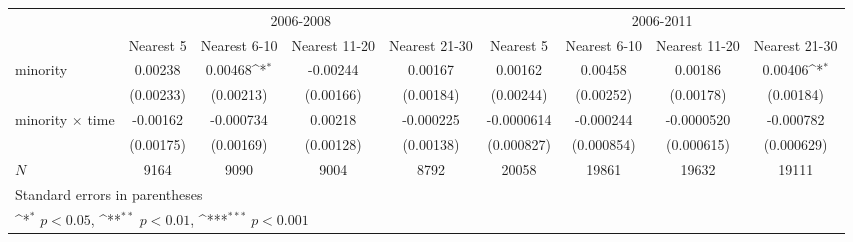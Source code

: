 {
\def\sym#1{\ifmmode^{#1}\else\(^{#1}\)\fi}
\begin{tabular}{l*{8}{c}}
\hline\hline
            &\multicolumn{4}{c}{2006-2008}                                                          &\multicolumn{4}{c}{2006-2011}                                                          \\\cmidrule(lr){2-5}\cmidrule(lr){6-9}
            &\multicolumn{1}{c}{Nearest 5}&\multicolumn{1}{c}{Nearest 6-10}&\multicolumn{1}{c}{Nearest 11-20}&\multicolumn{1}{c}{Nearest 21-30}&\multicolumn{1}{c}{Nearest 5}&\multicolumn{1}{c}{Nearest 6-10}&\multicolumn{1}{c}{Nearest 11-20}&\multicolumn{1}{c}{Nearest 21-30}\\
\hline
minority    &     0.00238         &     0.00468\sym{*}  &    -0.00244         &     0.00167         &     0.00162         &     0.00458         &     0.00186         &     0.00406\sym{*}  \\
            &   (0.00233)         &   (0.00213)         &   (0.00166)         &   (0.00184)         &   (0.00244)         &   (0.00252)         &   (0.00178)         &   (0.00184)         \\
[1em]
minority $\times$ time&    -0.00162         &   -0.000734         &     0.00218         &   -0.000225         &  -0.0000614         &   -0.000244         &  -0.0000520         &   -0.000782         \\
            &   (0.00175)         &   (0.00169)         &   (0.00128)         &   (0.00138)         &  (0.000827)         &  (0.000854)         &  (0.000615)         &  (0.000629)         \\
\hline
\(N\)       &        9164         &        9090         &        9004         &        8792         &       20058         &       19861         &       19632         &       19111         \\
\hline\hline
\multicolumn{9}{l}{\footnotesize Standard errors in parentheses}\\
\multicolumn{9}{l}{\footnotesize \sym{*} \(p<0.05\), \sym{**} \(p<0.01\), \sym{***} \(p<0.001\)}\\
\end{tabular}
}
